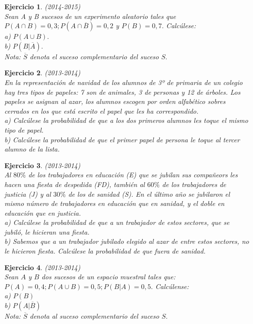 \documentclass[12pt, a4paper]{amsart}
\newtheorem{ejer}{Ejercicio}
\begin{document}
\begin{ejer}\em (2014-2015)\\
Sean A y B sucesos de un experimento aleatorio tales que $P(A \cap B) = 0, 3; P(A \cap \overline{B}) = 0, 2$ y $P(B) = 0,7.$ Calcúlese:\\
a) $P(A \cup B).$\\
b) $P(B | \overline{A}).$\\
Nota: $\overline{S}$ denota el suceso complementario del suceso $S.$
\end{ejer}

\begin{ejer}\em (2013-2014)\\
En la representación de navidad de los alumnos de 3º de primaria de un colegio hay tres tipos de papeles: 7 son de animales, 3 de personas y 12 de árboles. Los papeles se asignan al azar, los alumnos escogen por orden alfabético sobres cerrados en los que está escrito el papel que les ha correspondido.\\
a) Calcúlese la probabilidad de que a los dos primeros alumnos les toque el mismo tipo de papel.\\
b) Calcúlese la probabilidad de que el primer papel de persona le toque al tercer alumno de la lista.
\end{ejer}

\begin{ejer}\em (2013-2014)\\
Al $80\%$ de los trabajadores en educación (E) que se jubilan sus compañeors les hacen una fiesta de despedida (FD), también al $60\%$ de los trabajadores de justicia (J) y al $30\%$ de los de sanidad (S). En el último año se jubilaron el mismo número de trabajadores en educación que en sanidad, y el doble en educación que en justicia.\\
a) Calcúlese la probabilidad de que a un trabajador de estos sectores, que se jubiló, le hicieran una fiesta.\\
b) Sabemos que a un trabajador jubilado elegido al azar de entre estos sectores, no le hicieron fiesta. Calcúlese la probabilidad de que fuera de sanidad.
\end{ejer}

\begin{ejer}\em (2013-2014)\\
Sean $A$ y $B$ dos sucesos de un espacio muestral tales que: $P(A)=0,4; P(A\cup B)=0,5; P(B|A)=0,5.$ Calcúlense:\\
a) $P(B)$\\
b) $P(A|\overline{B})$\\
\textit{Nota: $\overline{S}$ denota al suceso complementario del suceso $S.$}
\end{ejer}
\end{document}
